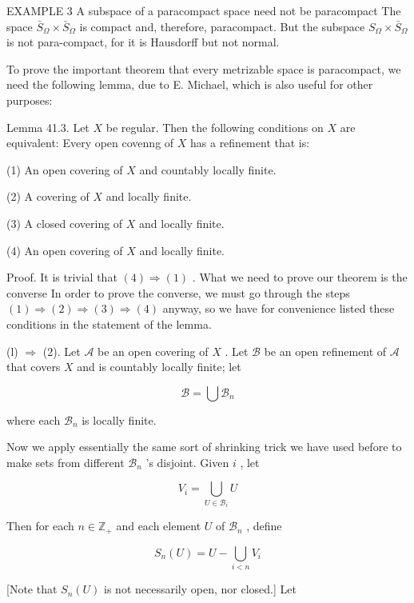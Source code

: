 \documentclass[10pt]{article}
\begin{document}
EXAMPLE 3 A subspace of a paracompact space need not be paracompact The space \({\bar{S}}_{\Omega } \times  {\bar{S}}_{\Omega }\) is compact and, therefore, paracompact. But the subspace \({S}_{\Omega } \times  {\bar{S}}_{\Omega }\) is not para-compact, for it is Hausdorff but not normal.

To prove the important theorem that every metrizable space is paracompact, we need the following lemma, due to E. Michael, which is also useful for other purposes:

Lemma 41.3. Let \(X\) be regular. Then the following conditions on \(X\) are equivalent: Every open covenng of \(X\) has a refinement that is:

(1) An open covering of \(X\) and countably locally finite.

(2) A covering of \(X\) and locally finite.

(3) A closed covering of \(X\) and locally finite.

(4) An open covering of \(X\) and locally finite.

Proof. It is trivial that \(\left( 4\right)  \Rightarrow  \left( 1\right)\) . What we need to prove our theorem is the converse In order to prove the converse, we must go through the steps \(\left( 1\right)  \Rightarrow  \left( 2\right)  \Rightarrow  \left( 3\right)  \Rightarrow  \left( 4\right)\) anyway, so we have for convenience listed these conditions in the statement of the lemma.

(l) \(\Rightarrow\) (2). Let \(\mathcal{A}\) be an open covering of \(X\) . Let \(\mathcal{B}\) be an open refinement of \(\mathcal{A}\) that covers \(X\) and is countably locally finite; let

\[
\mathcal{B} = \bigcup {\mathcal{B}}_{n}
\]

where each \({\mathcal{B}}_{n}\) is locally finite.

Now we apply essentially the same sort of shrinking trick we have used before to make sets from different \({\mathcal{B}}_{n}\) ’s disjoint. Given \(i\) , let

\[
{V}_{i} = \mathop{\bigcup }\limits_{{U \in  {\mathcal{B}}_{i}}}U
\]

Then for each \(n \in  {\mathbb{Z}}_{ + }\) and each element \(U\) of \({\mathcal{B}}_{n}\) , define

\[
{S}_{n}\left( U\right)  = U - \mathop{\bigcup }\limits_{{i < n}}{V}_{i}
\]

[Note that \({S}_{n}\left( U\right)\) is not necessarily open, nor closed.] Let
\end{document}
